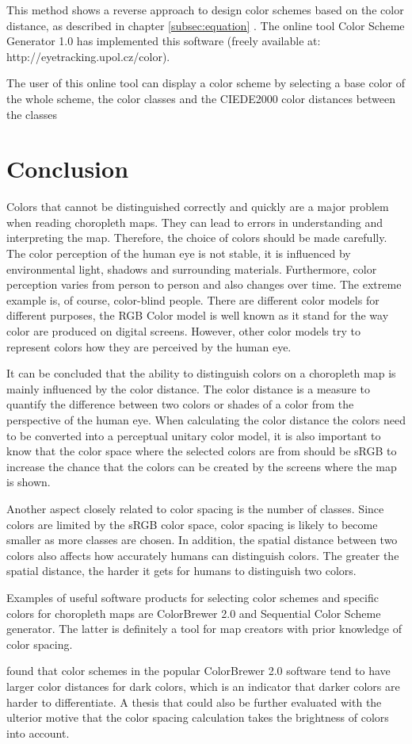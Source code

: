 This method shows a reverse approach to design color schemes based on the color distance, as described in chapter \ref{subsec:equation} \parencite{brychtovaC2017}. The online tool Color Scheme Generator 1.0 has implemented this software (freely available at: http://eyetracking.upol.cz/color).

The user of this online tool can display a color scheme by selecting a base color of the whole scheme, the color classes and the CIEDE2000 color distances between the classes \parencite{brychtovaDole2015}

\section{Conclusion}

Colors that cannot be distinguished correctly and quickly are a major problem when reading choropleth maps. They can lead to errors in understanding and interpreting the map. Therefore, the choice of colors should be made carefully.
The color perception of the human eye is not stable, it is influenced by environmental light, shadows and surrounding materials. Furthermore, color perception varies from person to person and also changes over time. The extreme example is, of course, color-blind people. 
There are different color models for different purposes, the RGB Color model is well known as it stand for the way color are produced on digital screens. However, other color models try to represent colors how they are perceived by the human eye. 

It can be concluded that the ability to distinguish colors on a choropleth map is mainly influenced by the color distance. The color distance is a measure to quantify the difference between two colors or shades of a color from the perspective of the human eye. When calculating the color distance the colors need to be converted into a perceptual unitary color model, it is also important to know that the color space where the selected colors are from should be sRGB to increase the chance that the colors can be created by the screens where the map is shown.

Another aspect closely related to color spacing is the number of classes. Since colors are limited by the sRGB color space, color spacing is likely to become smaller as more classes are chosen. 
In addition, the spatial distance between two colors also affects how accurately humans can distinguish colors. The greater the spatial distance, the harder it gets for humans to distinguish two colors. 

Examples of useful software products for selecting color schemes and specific colors for choropleth maps are ColorBrewer 2.0 and Sequential Color Scheme generator. The latter is definitely a tool for map creators with prior knowledge of color spacing. 

\textcite{brychtovaC2017} found that color schemes in the popular ColorBrewer 2.0 software tend to have larger color distances for dark colors, which is an indicator that darker colors are harder to differentiate. A thesis that could also be further evaluated with the ulterior motive that the color spacing calculation takes the brightness of colors into account.


%